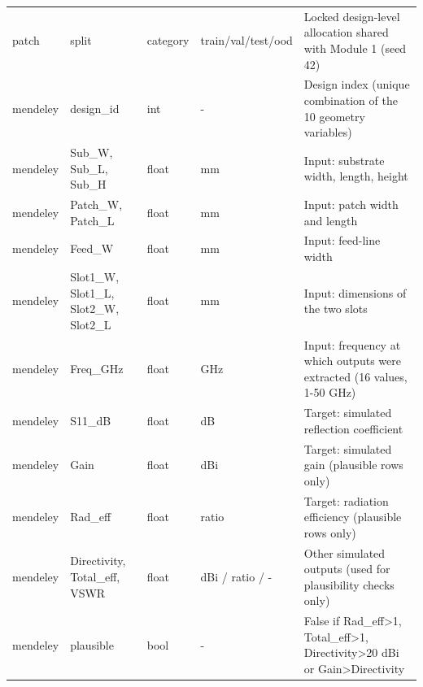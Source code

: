 \documentclass[11pt,a4paper]{article}
\begin{document}
\begin{table}[H]
\begin{tabularx}{\linewidth}{XXXXX}
patch & split & category & train/val/test/ood & Locked design-level allocation shared with Module 1 (seed 42) \\
mendeley & design\_id & int & - & Design index (unique combination of the 10 geometry variables) \\
mendeley & Sub\_W, Sub\_L, Sub\_H & float & mm & Input: substrate width, length, height \\
mendeley & Patch\_W, Patch\_L & float & mm & Input: patch width and length \\
mendeley & Feed\_W & float & mm & Input: feed-line width \\
mendeley & Slot1\_W, Slot1\_L, Slot2\_W, Slot2\_L & float & mm & Input: dimensions of the two slots \\
mendeley & Freq\_GHz & float & GHz & Input: frequency at which outputs were extracted (16 values, 1-50 GHz) \\
mendeley & S11\_dB & float & dB & Target: simulated reflection coefficient \\
mendeley & Gain & float & dBi & Target: simulated gain (plausible rows only) \\
mendeley & Rad\_eff & float & ratio & Target: radiation efficiency (plausible rows only) \\
mendeley & Directivity, Total\_eff, VSWR & float & dBi / ratio / - & Other simulated outputs (used for plausibility checks only) \\
mendeley & plausible & bool & - & False if Rad\_eff>1, Total\_eff>1, Directivity>20 dBi or Gain>Directivity \\
\bottomrule
\end{tabularx}
\end{table}
\end{document}
